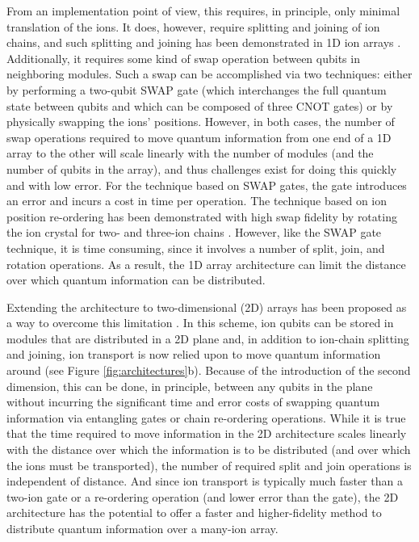 \documentclass[%
reprint,
 amsmath,amssymb,
]{revtex4-1}
\begin{document}
From an implementation point of view, this requires, in principle, only minimal translation of the ions.  It does, however, require splitting and joining of ion chains, and such splitting and joining has been demonstrated in 1D ion arrays \cite{BowlerDiabaticTransportSplit2012,RusterSplitJoin2014}. Additionally, it requires some kind of swap operation between qubits in neighboring modules.  Such a swap can be accomplished via two techniques: either by performing a two-qubit SWAP gate (which interchanges the full quantum state between qubits and which can be composed of three CNOT gates) or by physically swapping the ions' positions.  However, in both cases, the number of swap operations required to move quantum information from one end of a 1D array to the other will scale linearly with the number of modules (and the number of qubits in the array), and thus challenges exist for doing this quickly and with low error.   For the technique based on SWAP gates, the gate introduces an error and incurs a cost in time per operation.  The technique based on ion position re-ordering has been demonstrated with high swap fidelity by rotating the ion crystal for two- and three-ion chains \cite{KaufmannChainReorder2017}. However, like the SWAP gate technique, it is time consuming, since it involves a number of split, join, and rotation operations.   As a result, the 1D array architecture can limit the distance over which quantum information can be distributed.

Extending the architecture to two-dimensional (2D) arrays has been proposed as a way to overcome this limitation \cite{KielpinskiQCArchitecture2002}.  In this scheme, ion qubits can be stored in modules that are distributed in a 2D plane and, in addition to ion-chain splitting and joining, ion transport is now relied upon to move quantum information around (see Figure \ref{fig:architectures}b).  Because of the introduction of the second dimension, this can be done, in principle, between any qubits in the plane without incurring the significant time and error costs of swapping quantum information via entangling gates or chain re-ordering operations.   While it is true that the time required to move information in the 2D architecture scales linearly with the distance over which the information is to be distributed (and over which the ions must be transported), the number of required split and join operations is independent of distance.  And since ion transport is typically much faster than a two-ion gate or a re-ordering operation (and lower error than the gate), the 2D architecture has the potential to offer a faster and higher-fidelity method to distribute quantum information over a many-ion array.
\end{document}

